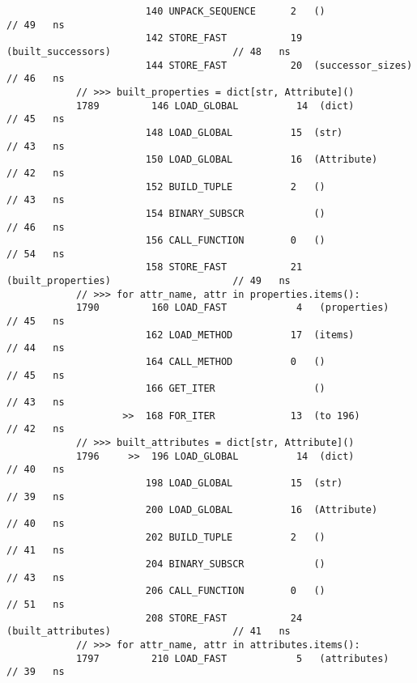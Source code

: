 \begin{code}
\begin{verbatim}
                        140 UNPACK_SEQUENCE      2   ()                                     // 49   ns
                        142 STORE_FAST           19  (built_successors)                     // 48   ns
                        144 STORE_FAST           20  (successor_sizes)                      // 46   ns
            // >>> built_properties = dict[str, Attribute]()
            1789         146 LOAD_GLOBAL          14  (dict)                                // 45   ns
                        148 LOAD_GLOBAL          15  (str)                                  // 43   ns
                        150 LOAD_GLOBAL          16  (Attribute)                            // 42   ns
                        152 BUILD_TUPLE          2   ()                                     // 43   ns
                        154 BINARY_SUBSCR            ()                                     // 46   ns
                        156 CALL_FUNCTION        0   ()                                     // 54   ns
                        158 STORE_FAST           21  (built_properties)                     // 49   ns
            // >>> for attr_name, attr in properties.items():
            1790         160 LOAD_FAST            4   (properties)                          // 45   ns
                        162 LOAD_METHOD          17  (items)                                // 44   ns
                        164 CALL_METHOD          0   ()                                     // 45   ns
                        166 GET_ITER                 ()                                     // 43   ns
                    >>  168 FOR_ITER             13  (to 196)                               // 42   ns
            // >>> built_attributes = dict[str, Attribute]()
            1796     >>  196 LOAD_GLOBAL          14  (dict)                                // 40   ns
                        198 LOAD_GLOBAL          15  (str)                                  // 39   ns
                        200 LOAD_GLOBAL          16  (Attribute)                            // 40   ns
                        202 BUILD_TUPLE          2   ()                                     // 41   ns
                        204 BINARY_SUBSCR            ()                                     // 43   ns
                        206 CALL_FUNCTION        0   ()                                     // 51   ns
                        208 STORE_FAST           24  (built_attributes)                     // 41   ns
            // >>> for attr_name, attr in attributes.items():
            1797         210 LOAD_FAST            5   (attributes)                          // 39   ns

\end{verbatim}
\end{code}
